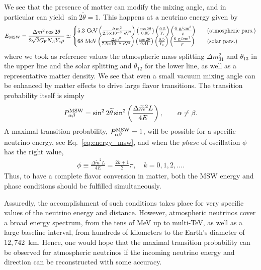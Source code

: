 We see that the presence of matter can modify the mixing angle, and in particular can yield $\sin2\tilde \theta=1$.
This happens at a neutrino energy given by
\begin{equation}\label{eq:energy_msw}
	E_{\rm MSW}=\frac{\Delta m^2 \cos 2\theta}{2\sqrt{2}G_{\rm F}N_AY_e\rho} \simeq
		\begin{cases}
		 5.3~{\rm GeV} \left(\frac{\Delta m^2}{2.5\times10^{-3}~{\rm eV}^2}\right)\left(\frac{\cos 2\theta}{0.95}\right)\left(\frac{0.5}{Y_e}\right)\left(\frac{6~{\rm g}/{\rm cm}^{3}}{\rho}\right) &\quad \text{(atmospheric pars.)}\\
		 68~{\rm MeV} \left(\frac{\Delta m^2}{7.5\times10^{-5}~{\rm eV}^2}\right)\left(\frac{\cos 2\theta}{0.41}\right)\left(\frac{0.5}{Y_e}\right)\left(\frac{6~{\rm g}/{\rm cm}^{3}}{\rho}\right) &\quad \text{(solar pars.)}
		\end{cases}
\end{equation}
where we took as reference values the atmospheric mass splitting $\Delta m^2_{31}$ and $\theta_{13}$ in the upper line and the solar splitting and $\theta_{12}$ for the lower line, as well as a representative matter density.
We see that even a small vacuum mixing angle can be enhanced by matter effects to drive large flavor transitions.
The transition probability itself is simply
\begin{align}
	P_{\alpha\beta}^{\rm MSW}= \sin^22\widetilde\theta\sin^2\left(\frac{\Delta\widetilde m^2 L}{4E}\right),\qquad \alpha\neq\beta.
\end{align}
A maximal transition probability, $P_{\alpha\beta}^{\rm MSW}=1$, will be possible for a specific neutrino energy, see Eq.~\eqref{eq:energy_msw}, and when the \emph{phase} of oscillation $\phi$ has the right value,
\begin{align*}
	\phi\equiv\frac{\Delta\widetilde m^2 L}{4E} = \frac{2k+1}{2}\pi,\quad k=0,1,2,\ldots.
\end{align*}
Thus, to have a complete flavor conversion in matter, both the MSW energy and phase conditions should be fulfilled simultaneously. 

Assuredly, the accomplishment of such conditions takes place for very specific values of the neutrino energy and distance. 
However, atmospheric neutrinos cover a broad energy spectrum, from the tens of MeV up to multi-TeV, as well as a large baseline interval, from hundreds of kilometers to the Earth's diameter of $12,742$~km.
Hence, one would hope that the maximal transition probability can be observed for atmospheric neutrinos if the incoming neutrino energy and direction can be reconstructed with some  accuracy.


